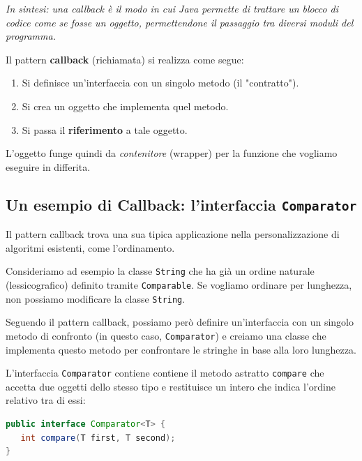 \textit{In sintesi: una callback è il modo in cui Java permette di trattare un blocco di codice come se fosse un oggetto, permettendone il passaggio tra diversi moduli del programma.}
\vspace{\baselineskip}

Il pattern \textbf{callback} (richiamata) si realizza come segue:
\begin{enumerate}
    \item Si definisce un'interfaccia con un singolo metodo (il "contratto").
    \item Si crea un oggetto che implementa quel metodo.
    \item Si passa il \textbf{riferimento} a tale oggetto.
\end{enumerate}
L'oggetto funge quindi da \textit{contenitore} (wrapper) per la funzione che vogliamo eseguire in differita.

\subsection{Un esempio di Callback: l'interfaccia \texttt{Comparator}}

Il pattern callback trova una sua tipica applicazione nella personalizzazione di algoritmi esistenti, come l'ordinamento.

Consideriamo ad esempio la classe \texttt{String} che ha già un ordine naturale (lessicografico) definito tramite \texttt{Comparable}. Se vogliamo ordinare per lunghezza, non possiamo modificare la classe \texttt{String}. 



Seguendo il pattern callback, possiamo però definire un'interfaccia con un singolo metodo di confronto (in questo caso, \texttt{Comparator}) e creiamo una classe che implementa questo metodo per confrontare le stringhe in base alla loro lunghezza.

L'interfaccia \texttt{Comparator} contiene contiene il metodo astratto \texttt{compare} che accetta due oggetti dello stesso tipo e restituisce un intero che indica l'ordine relativo tra di essi:

\begin{lstlisting}[language=Java, caption={il metodo compare di Comparator}]
public interface Comparator<T> {
   int compare(T first, T second);
}
\end{lstlisting}

